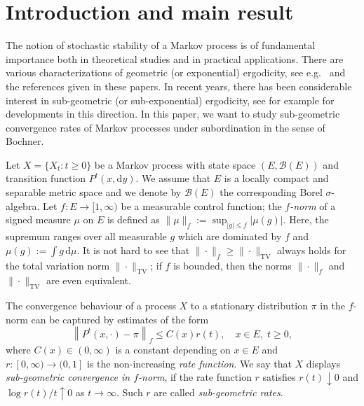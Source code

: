 \documentclass{aptpub}
\newcommand\dup{\mathrm{d}}
\numberwithin{equation}{section}
\begin{document}
\section{Introduction and main result}\label{sec1} %



The notion of stochastic stability of a Markov process is of fundamental importance both in theoretical studies and in practical applications. There are various characterizations of geometric (or exponential) ergodicity, see e.g.\ \cite{MT93, MT93a, MT93b, che04, Chen05, DMT95} and the references given in these papers. In recent years, there has been considerable interest in sub-geometric (or sub-exponential) ergodicity, see for example \cite{DFMS04, for05, DMS07, dou09, But14, RW01} for developments in this direction. In this paper, we want to study sub-geometric convergence rates of Markov processes under subordination in the sense of Bochner.


Let $X=\{X_t:t\geq0\}$ be a Markov process with state space $(E,\mathscr{B}(E))$ and transition function $P^t(x,\dup y)$.
We assume that $E$ is a locally compact and separable metric space and we denote by $\mathscr{B}(E)$ the corresponding Borel $\sigma$-algebra. Let $f:E\to[1,\infty)$ be a measurable control function; the \emph{$f$-norm} of a signed measure $\mu$ on $E$ is defined as $\|\mu\|_f:=\sup_{|g|\leq f}|\mu(g)|$. Here, the supremum ranges over all measurable $g$ which are dominated by $f$ and $\mu(g) := \int g\,\dup\mu$. It is not hard to see that $\|\cdot\|_f\geq\|\cdot\|_{\operatorname{TV}}$ always holds for the total variation norm $\|\cdot\|_{\operatorname{TV}}$; if $f$ is bounded, then the norms $\|\cdot\|_f$ and $\|\cdot\|_{\operatorname{TV}}$ are even equivalent.


The convergence behaviour of a process $X$ to a stationary distribution $\pi$ in the $f$-norm can be captured by estimates of the form
\begin{equation}\label{rate1}
    \left\|P^t(x,\cdot)-\pi\right\|_f
    \leq C(x)r(t), \quad x\in E,\; t\geq 0,
\end{equation}
where $C(x)\in (0,\infty)$ is a constant depending on $x\in E$ and  $r:[0,\infty)\to(0,1]$ is the non-increasing \emph{rate function}. We say that $X$ displays \emph{sub-geometric convergence in $f$-norm}, if the rate function $r$ satisfies $r(t)\downarrow 0$ and $\log r(t)/t \uparrow 0$ as $t\to\infty$. Such $r$ are called \emph{sub-geometric rates}.
\end{document}
